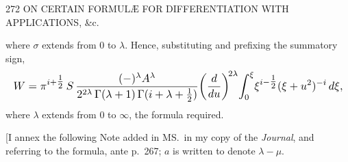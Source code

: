 \documentclass[11pt]{article}
\begin{document}
\vspace{2em}

\begin{center}\small 272 \quad ON CERTAIN FORMUL\AE{} FOR DIFFERENTIATION WITH APPLICATIONS, \&c. \quad [41]\end{center}

\noindent where $\sigma$ extends from $0$ to $\lambda$. Hence, substituting and prefixing the summatory sign,
\[
  \resizebox{\textwidth}{!}{$\displaystyle
  W = \pi^{i+\tfrac{1}{2}}\,S\,\frac{(-)^{\lambda}A^{\lambda}}{2^{2\lambda}\,\Gamma(\lambda+1)\,\Gamma(i+\lambda+\tfrac{1}{2})}\!\left(\frac{d}{du}\right)^{\!2\lambda}\!\int_{0}^{\xi}\!\xi^{i-\tfrac{1}{2}}(\xi+u^{2})^{-i}\,d\xi,
  $}
\]
where $\lambda$ extends from $0$ to $\infty$, the formula required.

\bigskip

[I annex the following Note added in MS.\ in my copy of the \textit{Journal}, and referring to the formula, ante p.~267; $a$ is written to denote $\lambda - \mu$.

\smallskip
\end{document}
